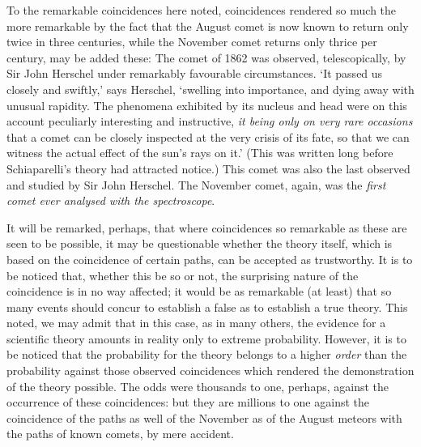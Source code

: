 \documentclass[letterpaper,12pt,oneside,openany]{memoir}
\begin{document}
To the remarkable coincidences here noted, coincidences
rendered so much the more remarkable by
the fact that the August comet is now known to return
only twice in three centuries, while the November
comet returns only thrice per century, may be added
these:
The comet of 1862 was observed, telescopically, by
Sir John Herschel under remarkably favourable circumstances.
`It passed us closely and swiftly,' says
Herschel, `swelling into importance, and dying away
with unusual rapidity. The phenomena exhibited by
its nucleus and head were on this account peculiarly
interesting and instructive, \emph{it being only on very rare
occasions} that a comet can be closely inspected at the
very crisis of its fate, so that we can witness the actual
effect of the sun's rays on it.' (This was written long
before Schiaparelli's theory had attracted notice.) This
comet was also the last observed and studied by Sir
John Herschel. The November comet, again, was the
\textit{first comet ever analysed with the spectroscope}.

It will be remarked, perhaps, that where coincidences
so remarkable as these are seen to be possible, it may
be questionable whether the theory itself, which is
based on the coincidence of certain paths, can be
accepted as trustworthy. It is to be noticed that,
whether this be so or not, the surprising nature of the
coincidence is in no way affected; it would be as
remarkable (at least) that so many events should
concur to establish a false as to establish a true theory.
This noted, we may admit that in this case, as in many
others, the evidence for a scientific theory amounts in
reality only to extreme probability. However, it is to
be noticed that the probability for the theory belongs
to a higher \textit{order} than the probability against those
observed coincidences which rendered the demonstration
of the theory possible. The odds were thousands
to one, perhaps, against the occurrence of these coincidences:
but they are millions to one against the
coincidence of the paths as well of the November as of
the August meteors with the paths of known comets,
by mere accident.
\end{document}
